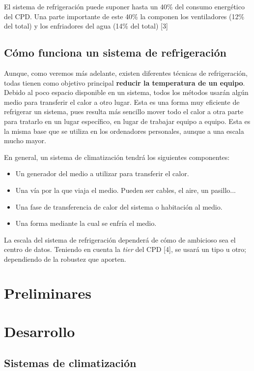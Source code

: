 El sistema de refrigeración puede suponer hasta un 40\% del consumo energético del CPD. Una parte importante de este 40\% la componen los ventiladores (12\% del total) y los enfriadores del agua (14\% del total) [3]

\section{Cómo funciona un sistema de refrigeración}

Aunque, como veremos más adelante, existen diferentes técnicas de refrigeración, todas tienen como objetivo principal \textbf{reducir la temperatura de un equipo}. Debido al poco espacio disponible en un sistema, todos los métodos usarán algún medio para transferir el calor a otro lugar. Esta es una forma muy eficiente de refrigerar un sistema, pues resulta más sencillo mover todo el calor a otra parte para tratarlo en un lugar específico, en lugar de trabajar equipo a equipo. Esta es la misma base que se utiliza en los ordenadores personales, aunque a una escala mucho mayor.

En general, un sistema de climatización tendrá los siguientes componentes:

\begin{itemize}
    \item Un generador del medio a utilizar para transferir el calor.
    \item Una vía por la que viaja el medio. Pueden ser cables, el aire, un pasillo...
    \item Una fase de transferencia de calor del sistema o habitación al medio.
    \item Una forma mediante la cual se enfría el medio.
\end{itemize}

La escala del sistema de refrigeración dependerá de cómo de ambicioso sea el centro de datos. Teniendo en cuenta la \textit{tier} del CPD [4], se usará un tipo u otro; dependiendo de la robustez que aporten.

\chapter{Preliminares}

\chapter{Desarrollo}

\section{Sistemas de climatización}

